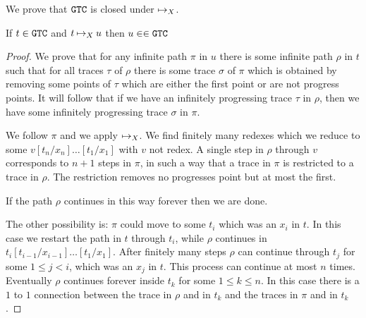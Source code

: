 We prove that ${\tt GTC}$ is closed under $\mathbin{\mapsto}_X$.


\begin{lemma}
If $t \in {\tt GTC}$ and $t \mathbin{\mapsto}_X u$ then $u \in \in {\tt GTC}$
\end{lemma}

\begin{proof}
We prove that for any infinite path $\pi$ in $u$ there is some infinite path $\rho$ in $t$ such that
for all traces $\tau$ of $\rho$ there is some trace $\sigma$ of $\pi$ which is obtained by
removing some points of $\tau$ which are either the first point or are not progress points. 
It will follow that if we have an infinitely progressing trace $\tau$ in $\rho$, then we have some infinitely
progressing trace $\sigma$ in $\pi$.

We follow $\pi$ and we apply $\mathbin{\mapsto}_X$. We find finitely many redexes which we reduce to
some $v[t_n/x_n]\ldots[t_1/x_1]$ with $v$ not redex. A single step in $\rho$ through $v$
corresponds to $n+1$ steps in $\pi$, in such a way that a trace in $\pi$ is restricted to a trace
in $\rho$. The restriction removes no progresses point but at most the first. 

If the path $\rho$ continues in this way forever then we are done.

The other possibility is: $\pi$ could move to some $t_i$ which was an $x_i$ in $t$. In this case we restart
the path in $t$ through $t_i$, while $\rho$ continues in $t_i[t_{i-1}/x_{i-1}]\ldots[t_1/x_1]$.
After finitely many steps $\rho$ can continue through $t_j$ for some $1 \le j < i$, which was an $x_j$
in $t$. This process can continue at most $n$ times. 
Eventually $\rho$ continues forever inside $t_k$ for some $1 \le k \le n$. In this case there is a $1$ to $1$
connection between the trace in $\rho$ and in $t_k$ and the traces in $\pi$ and in $t_k$.
\end{proof}